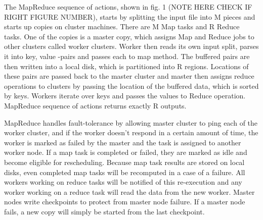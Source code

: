 \documentclass{article}
\theoremstyle{definition}
\begin{document}
The MapReduce sequence of actions, shown in fig. 1 (NOTE HERE CHECK IF RIGHT FIGURE NUMBER), starts by splitting the input file into M pieces and starts up copies on cluster machines. There are M Map tasks and R Reduce tasks. One of the copies is a master copy, which assigns Map and Reduce jobs to other clusters called worker clusters. Worker then reads its own input split, parses it into key, value -pairs and passes each to map method. The buffered pairs are then written into a local disk, which is partitioned into R regions. Locations of these pairs are passed back to the master cluster and master then assigns reduce operations to clusters by passing the location of the buffered data, which is sorted by keys. Workers iterate over keys and passes the values to Reduce operation. MapReduce sequence of actions returns exactly R outputs. 

MapReduce handles fault-tolerance by allowing master cluster to ping each of the worker cluster, and if the worker doesn't respond in a certain amount of time, the worker is marked as failed by the master and the task is assigned to another worker node. If a map task is completed or failed, they are marked as idle and become eligible for rescheduling. Because map task results are stored on local disks, even completed map tasks will be recomputed in a case of a failure. All workers working on reduce tasks will be notified of this re-execution and any worker working on a reduce task will read the data from the new worker. Master nodes write checkpoints to protect from master node failure. If a master node fails, a new copy will simply be started from the last checkpoint.  \\ 
\end{document}

